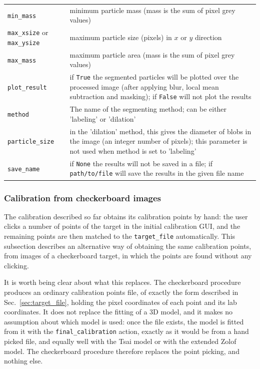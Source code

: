 \documentclass[10pt,a4paper]{article}
\begin{document}
\begin{table}[!ht]
\begin{tabular}{l m{13cm}}
		\texttt{min\_mass} & minimum particle mass (mass is the sum of pixel grey values)\\[.3em]
		
		\texttt{max\_xsize} or \texttt{max\_ysize} & maximum particle size (pixels) in $x$ or $y$ direction \\[.3em]
		
		\texttt{max\_mass} & maximum particle area (mass is the sum of pixel grey values) \\[.3em]
		
		\texttt{plot\_result} & if \texttt{True} the segmented particles will be plotted over the processed image (after applying blur, local mean subtraction and masking); if \texttt{False} will not plot the results \\[.3em]
		
		\texttt{method} & The name of the segmenting method; can be either 'labeling' or 'dilation' \\
		
		\texttt{particle\_size} & in the 'dilation' method, this gives the diameter of blobs in the image (an integer number of pixels); this parameter is not used when method is set to 'labeling' \\
		
		\texttt{save\_name} & if \texttt{None} the results will not be saved in a file; if \texttt{path/to/file} will save the results in the given file name \\
		
		\hline
	\end{tabular}
\end{table}




\subsubsection{Calibration from checkerboard images}\label{sec:checkerboard_cal}

The calibration described so far obtains its calibration points by hand: the user clicks a number of points of the target in the initial calibration GUI, and the remaining points are then matched to the \texttt{target\_file} automatically. This subsection describes an alternative way of obtaining the same calibration points, from images of a checkerboard target, in which the points are found without any clicking.

It is worth being clear about what this replaces. The checkerboard procedure produces an ordinary calibration points file, of exactly the form described in Sec.~\ref{sec:target_file}, holding the pixel coordinates of each point and its lab coordinates. It does not replace the fitting of a 3D model, and it makes no assumption about which model is used: once the file exists, the model is fitted from it with the \texttt{final\_calibration} action, exactly as it would be from a hand picked file, and equally well with the Tsai model or with the extended Zolof model. The checkerboard procedure therefore replaces the point picking, and nothing else.
\end{document}
